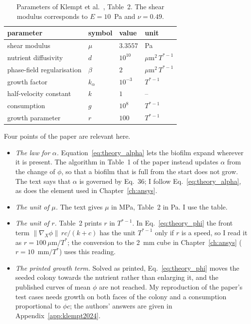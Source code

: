 \begin{table}[htbp]
  \centering
  \caption[Parameters of Klempt et al.\ 2024]{Parameters of Klempt et
    al.~\cite{Klempt2024DiffusionDrivenGrowth}, Table~2. The shear modulus
    corresponds to $E=10$~Pa and $\nu=0.49$.}
  \label{tab:theory_klempt2024}
  \begin{tabular}{llll}
    \hline
    parameter & symbol & value & unit\\
    \hline
    shear modulus & $\mu$ & $3.3557$ & Pa\\
    nutrient diffusivity & $d$ & $10^{10}$ & $\mu$m$^2\,T^{*-1}$\\
    phase-field regularisation & $\beta$ & $2$ & $\mu$m$^2\,T^{*-1}$\\
    growth factor & $k_\alpha$ & $10^{-3}$ & $T^{*-1}$\\
    half-velocity constant & $k$ & $1$ & --\\
    consumption & $g$ & $10^{8}$ & $T^{*-1}$\\
    growth parameter & $r$ & $100$ & $T^{*-1}$\\
    \hline
  \end{tabular}
\end{table}

Four points of the paper are relevant here.
\begin{itemize}
  \item \emph{The law for $\alpha$.} Equation~\eqref{eq:theory_alpha} lets the
        biofilm expand wherever it is present. The algorithm in Table~1 of the
        paper instead updates $\alpha$ from the change of $\phi$, so that a
        biofilm that is full from the start does not grow. The text says that
        $\alpha$ is governed by Eq.~36; I follow
        Eq.~\eqref{eq:theory_alpha}, as does the element used in
        Chapter~\ref{ch:ansys}.
  \item \emph{The unit of $\mu$.} The text gives $\mu$ in MPa, Table~2 in Pa.
        I use the table.
  \item \emph{The unit of $r$.} Table~2 prints $r$ in $T^{*-1}$. In
        Eq.~\eqref{eq:theory_phi} the front term
        $\|\nabla_X\phi\|\,rc/(k+c)$ has the unit $T^{*-1}$ only if $r$ is a
        speed, so I read it as $r=100~\mu$m$/T^*$; the conversion to the 2~mm
        cube in Chapter~\ref{ch:ansys} ($r=10$~mm$/T^*$) uses this reading.
  \item \emph{The printed growth term.} Solved as printed,
        Eq.~\eqref{eq:theory_phi} moves the seeded colony towards the
        nutrient rather than enlarging it, and the published curves of mean
        $\phi$ are not reached. My reproduction of the paper's test cases
        needs growth on both faces of the colony and a consumption
        proportional to $\phi c$; the authors' answers are given in
        Appendix~\ref{app:klempt2024}.
\end{itemize}

